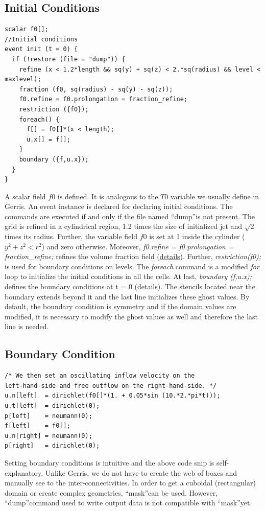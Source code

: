 \documentclass[]{article}
\newcommand\Colorhref[3][blue]{\href{#2}{\color{#1}#3}}
\begin{document}
\subsection{Initial Conditions}
\begin{verbatim}
scalar f0[];
//Initial conditions
event init (t = 0) {
  if (!restore (file = "dump")) {
    refine (x < 1.2*length && sq(y) + sq(z) < 2.*sq(radius) && level < maxlevel);
    fraction (f0, sq(radius) - sq(y) - sq(z));
    f0.refine = f0.prolongation = fraction_refine;
    restriction ({f0});
    foreach() {
      f[] = f0[]*(x < length);
      u.x[] = f[];
    }
    boundary ({f,u.x});
  }
}
\end{verbatim}
A scalar field $f0$ is defined. It is analogous to the $T0$ variable we usually define in Gerris. An event instance is declared for declaring initial conditions. The commands are executed if and only if the file named \textquotedblleft dump\textquotedblright is not present. The grid is refined in a cylindrical region, 1.2 times the size of initialized jet and $\sqrt{2}$ times its radius. Further, the variable field $f0$ is set at 1 inside the cylinder ($y^2 + z^2 < r^2$) and zero otherwise. Moreover, \textit{f0.refine = f0.prolongation = fraction\_refine;} refines the volume fraction field (\Colorhref{http://basilisk.fr/src/fractions.h\#32}{details}). Further, \textit{restriction({f0});} is used for boundary conditions on levels. The \textit{foreach} command is a modified \textit{for} loop to initialize the initial conditions in all the cells. At last, \textit{boundary ({f,u.x});} defines the boundary conditions at t = 0 (\Colorhref{http://basilisk.fr/Basilisk\%20C\#boundary-conditions}{details}). The stencils located near the boundary extends beyond it and the last line initializes these ghost values. By default, the boundary condition is symmetry and if the domain values are modified, it is necessary to modify the ghost values as well and therefore the last line is needed. 
\subsection{Boundary Condition}
\begin{verbatim}
/* We then set an oscillating inflow velocity on the
left-hand-side and free outflow on the right-hand-side. */
u.n[left]  = dirichlet(f0[]*(1. + 0.05*sin (10.*2.*pi*t)));
u.t[left]  = dirichlet(0);
p[left]    = neumann(0);
f[left]    = f0[];
u.n[right] = neumann(0);
p[right]   = dirichlet(0);
\end{verbatim}
Setting boundary conditions is intuitive and the above code snip is self-explanatory. Unlike Gerris, we do not have to create the web of boxes and manually see to the inter-connectivities. In order to get a cuboidal (rectangular) domain or create complex geometries, \textquotedblleft mask\textquotedblright can be used. However, \textquotedblleft dump\textquotedblright command used to write output data is not compatible with \textquotedblleft mask\textquotedblright yet. 
\end{document}
